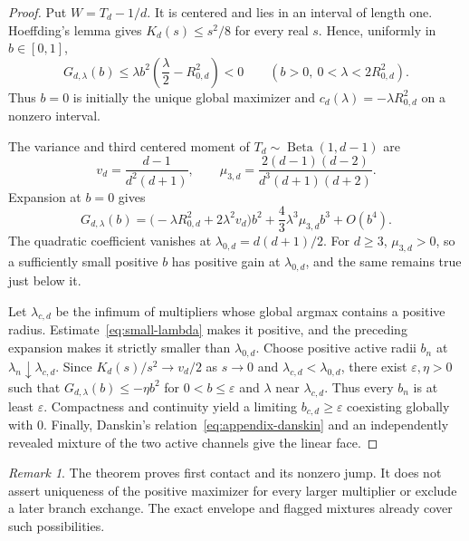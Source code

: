 \documentclass[11pt,a4paper]{article}
\theoremstyle{remark}
\newtheorem{remark}[theorem]{Remark}
\begin{document}
\begin{proof}
Put $W=T_d-1/d$.  It is centered and lies in an interval of length one.
Hoeffding's lemma gives $K_d(s)\le s^2/8$ for every real $s$.  Hence,
uniformly in $b\in[0,1]$,
\begin{equation}
 G_{d,\lambda}(b)\le
 \lambda b^2\left(\frac{\lambda}{2}-R_{0,d}^2\right)<0
 \qquad\left(b>0,\ 0<\lambda<2R_{0,d}^2\right).
 \label{eq:small-lambda}
\end{equation}
Thus $b=0$ is initially the unique global maximizer and
$c_d(\lambda)=-\lambda R_{0,d}^2$ on a nonzero interval.

The variance and third centered moment of
$T_d\sim\operatorname{Beta}(1,d-1)$ are
\begin{equation}
 v_d=\frac{d-1}{d^2(d+1)},\qquad
 \mu_{3,d}=\frac{2(d-1)(d-2)}{d^3(d+1)(d+2)}.
 \label{eq:finite-cumulants}
\end{equation}
Expansion at $b=0$ gives
\begin{equation}
 G_{d,\lambda}(b)=
 \bigl(-\lambda R_{0,d}^2+2\lambda^2v_d\bigr)b^2
 +\frac43\lambda^3\mu_{3,d}b^3+O(b^4).
 \label{eq:finite-landau}
\end{equation}
The quadratic coefficient vanishes at $\lambda_{0,d}=d(d+1)/2$.  For
$d\ge3$, $\mu_{3,d}>0$, so a sufficiently small positive $b$ has positive
gain at $\lambda_{0,d}$, and the same remains true just below it.

Let $\lambda_{c,d}$ be the infimum of multipliers whose global argmax contains
a positive radius.  Estimate~\eqref{eq:small-lambda} makes it positive, and
the preceding expansion makes it strictly smaller than $\lambda_{0,d}$.
Choose positive active radii $b_n$ at
$\lambda_n\downarrow\lambda_{c,d}$.  Since
$K_d(s)/s^2\to v_d/2$ as $s\to0$ and
$\lambda_{c,d}<\lambda_{0,d}$, there exist $\varepsilon,\eta>0$ such that
$G_{d,\lambda}(b)\le-\eta b^2$ for
$0<b\le\varepsilon$ and $\lambda$ near $\lambda_{c,d}$.  Thus every $b_n$ is
at least $\varepsilon$.  Compactness and continuity yield a limiting
$b_{c,d}\ge\varepsilon$ coexisting globally with $0$.  Finally,
Danskin's relation~\eqref{eq:appendix-danskin} and an independently revealed
mixture of the two active channels give the linear face.
\end{proof}

\begin{remark}
The theorem proves first contact and its nonzero jump.  It does not assert
uniqueness of the positive maximizer for every larger multiplier or exclude a
later branch exchange.  The exact envelope and flagged mixtures already cover
such possibilities.
\end{remark}
\end{document}
